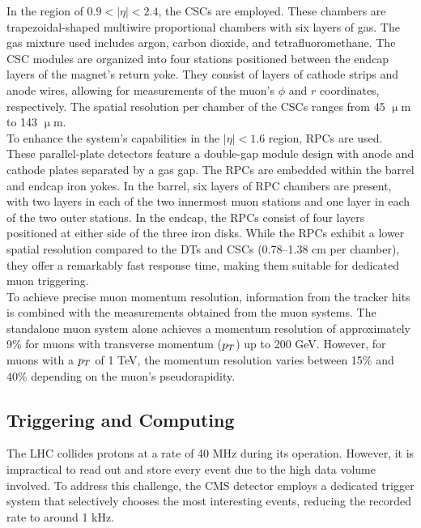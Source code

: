 In the region of $0.9 < |\eta| < 2.4$, the \ac{CSC}s are employed. 
These chambers are trapezoidal-shaped multiwire proportional chambers with six layers of gas. 
The gas mixture used includes argon, carbon dioxide, and tetrafluoromethane. 
The \ac{CSC} modules are organized into four stations positioned between the endcap layers of the magnet's return yoke. 
They consist of layers of cathode strips and anode wires, allowing for measurements of the muon's $\phi$ and $r$ coordinates, respectively. 
The spatial resolution per chamber of the \ac{CSC}s ranges from 45 $\upmu$m to 143 $\upmu$m. \\

To enhance the system's capabilities in the $|\eta| < 1.6$ region, \ac{RPC}s are used. 
These parallel-plate detectors feature a double-gap module design with anode and cathode plates separated by a gas gap. 
The \ac{RPC}s are embedded within the barrel and endcap iron yokes. In the barrel, six layers of \ac{RPC} chambers are present, with two layers in each of the two innermost muon stations and one layer in each of the two outer stations. 
In the endcap, the \ac{RPC}s consist of four layers positioned at either side of the three iron disks. 
While the \ac{RPC}s exhibit a lower spatial resolution compared to the \ac{DT}s and \ac{CSC}s (0.78–1.38 cm per chamber), they offer a remarkably fast response time, making them suitable for dedicated muon triggering. \\

To achieve precise muon momentum resolution, information from the tracker hits is combined with the measurements obtained from the muon systems. 
The standalone muon system alone achieves a momentum resolution of approximately 9\% for muons with transverse momentum ($p_{T}$) up to 200 GeV. 
However, for muons with a $p_{T}$ of 1 TeV, the momentum resolution varies between 15\% and 40\% depending on the muon's pseudorapidity.

\subsection{Triggering and Computing}

The \ac{LHC} collides protons at a rate of 40 MHz during its operation. 
However, it is impractical to read out and store every event due to the high data volume involved. 
To address this challenge, the \ac{CMS} detector employs a dedicated trigger system that selectively chooses the most interesting events, reducing the recorded rate to around 1 kHz. \\

